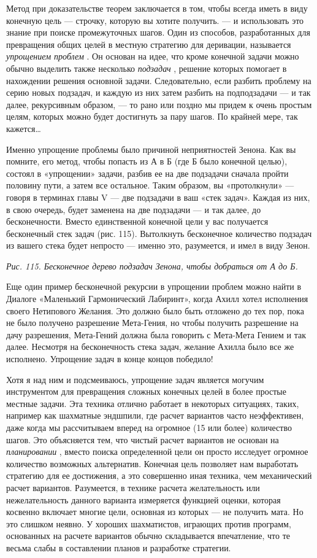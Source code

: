 Метод при доказательстве теорем заключается в том, чтобы всегда иметь в виду конечную цель --- строчку, которую вы хотите получить. --- и использовать это знание при поиске промежуточных шагов. Один из способов, разработанных для превращения общих целей в местную стратегию для деривации, называется \emph{упрощением проблем} . Он основан на идее, что кроме конечной задачи можно обычно выделить также несколько \emph{подзадач} , решение которых помогает в нахождении решения основной задачи. Следовательно, если разбить проблему на серию новых подзадач, и каждую из них затем разбить на подподзадачи --- и так далее, рекурсивным образом, --- то рано или поздно мы придем к очень простым целям, которых можно будет достигнуть за пару шагов. По крайней мере, так кажется\ldots{}

Именно упрощение проблемы было причиной неприятностей Зенона. Как вы помните, его метод, чтобы попасть из А в Б (где Б было конечной целью), состоял в «упрощении» задачи, разбив ее на две подзадачи сначала пройти половину пути, а затем все остальное. Таким образом, вы «протолкнули» --- говоря в терминах главы V --- две подзадачи в ваш «стек задач». Каждая из них, в свою очередь, будет заменена на две подзадачи --- и так далее, до бесконечности. Вместо единственной конечной цели у вас получается бесконечный стек задач (рис. 115). Вытолкнуть бесконечное количество подзадач из вашего стека будет непросто --- именно это, разумеется, и имел в виду Зенон.

\emph{Рис. 115. Бесконечное дерево подзадач Зенона, чтобы добраться от А до Б.}

Еще один пример бесконечной рекурсии в упрощении проблем можно найти в Диалоге «Маленький Гармонический Лабиринт», когда Ахилл хотел исполнения своего Нетипового Желания. Это должно было быть отложено до тех пор, пока не было получено разрешение Мета-Гения, но чтобы получить разрешение на дачу разрешения, Мета-Гений должна была говорить с Мета-Мета Гением и так далее. Несмотря на бесконечность стека задач, желание Ахилла было все же исполнено. Упрощение задач в конце концов победило!

Хотя я над ним и подсмеиваюсь, упрощение задач является могучим инструментом для превращения сложных конечных целей в более простые местные задачи. Эта техника отлично работает в некоторых ситуациях, таких, например как шахматные эндшпили, где расчет вариантов часто неэффективен, даже когда мы рассчитываем вперед на огромное (15 или более) количество шагов. Это объясняется тем, что чистый расчет вариантов не основан на \emph{планировании} , вместо поиска определенной цели он просто исследует огромное количество возможных альтернатив. Конечная цель позволяет нам выработать стратегию для ее достижения, а это совершенно иная техника, чем механический расчет вариантов. Разумеется, в технике расчета желательность или нежелательность данного варианта измеряется функцией оценки, которая косвенно включает многие цели, основная из которых --- не получить мата. Но это слишком неявно. У хороших шахматистов, играющих против программ, основанных на расчете вариантов обычно складывается впечатление, что те весьма слабы в составлении планов и разработке стратегии.

